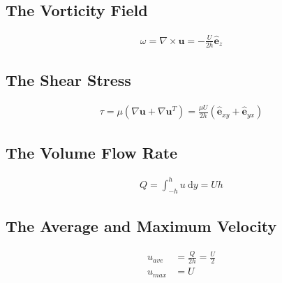 \begin{solution}

  \subsection{The Vorticity Field}
    \begin{align}
      \omega=\nabla\times\mathbf{u}=-\frac{U}{2h}\hat{\mathbf{e}}_z
    \end{align}
    
  \subsection{The Shear Stress}
    \begin{align}
      \tau=\mu\left(\nabla\mathbf{u}+\nabla\mathbf{u}^T\right)=\frac{\mu U}{2h}\left(\hat{\mathbf{e}}_{xy}+\hat{\mathbf{e}}_{yx}\right)
    \end{align}
  
  \subsection{The Volume Flow Rate}
    \begin{align}
      Q=\int_{-h}^{h}\!u~\text{d}y=Uh
    \end{align}

  \subsection{The Average and Maximum Velocity}
    \begin{align}
      u_{ave}&=\frac{Q}{2h}=\frac{U}{2} \\
      u_{max}&=U
    \end{align}
    

\end{solution}